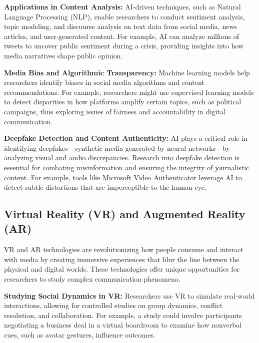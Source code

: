 \documentclass[
]{book}
\begin{document}
\textbf{Applications in Content Analysis:} AI-driven techniques, such as Natural Language Processing (NLP), enable researchers to conduct sentiment analysis, topic modeling, and discourse analysis on text data from social media, news articles, and user-generated content. For example, AI can analyze millions of tweets to uncover public sentiment during a crisis, providing insights into how media narratives shape public opinion.

\textbf{Media Bias and Algorithmic Transparency:} Machine learning models help researchers identify biases in social media algorithms and content recommendations. For example, researchers might use supervised learning models to detect disparities in how platforms amplify certain topics, such as political campaigns, thus exploring issues of fairness and accountability in digital communication.

\textbf{Deepfake Detection and Content Authenticity:} AI plays a critical role in identifying deepfakes---synthetic media generated by neural networks---by analyzing visual and audio discrepancies. Research into deepfake detection is essential for combating misinformation and ensuring the integrity of journalistic content. For example, tools like Microsoft Video Authenticator leverage AI to detect subtle distortions that are imperceptible to the human eye.

\subsection*{Virtual Reality (VR) and Augmented Reality (AR)}\label{virtual-reality-vr-and-augmented-reality-ar}

VR and AR technologies are revolutionizing how people consume and interact with media by creating immersive experiences that blur the line between the physical and digital worlds. These technologies offer unique opportunities for researchers to study complex communication phenomena.

\textbf{Studying Social Dynamics in VR:} Researchers use VR to simulate real-world interactions, allowing for controlled studies on group dynamics, conflict resolution, and collaboration. For example, a study could involve participants negotiating a business deal in a virtual boardroom to examine how nonverbal cues, such as avatar gestures, influence outcomes.
\end{document}
